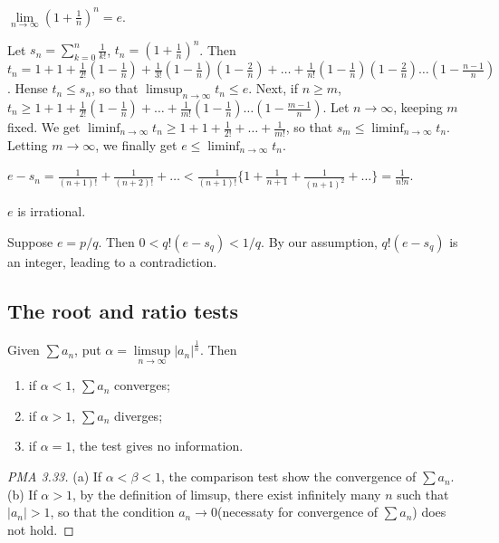 \begin{theorem}
[pma 3.31]
$\lim\limits_{n\to \infty}(1+\frac{1}{n})^n=e$.
\end{theorem}
\begin{hardproof}
Let $s_n=\sum_{k=0}^n\frac{1}{k!}$, $t_n=(1+\frac{1}{n})^n$. Then $t_n=1+1+\frac{1}{2!}(1-\frac{1}{n})+\frac{1}{3!}(1-\frac{1}{n})(1-\frac{2}{n})+\dots+\frac{1}{n!}(1-\frac{1}{n})(1-\frac{2}{n})\dots(1-\frac{n-1}{n})$. Hense $t_n\leq s_n$, so that $\limsup_{n\to \infty}t_n\leq e$. Next, if $n\geq m$, $t_n\geq 1+1+\frac{1}{2!}(1-\frac{1}{n})+\dots+\frac{1}{m!}(1-\frac{1}{n})\dots(1-\frac{m-1}{n})$. Let $n\to \infty$, keeping $m$ fixed. We get $\liminf_{n\to \infty}t_n\geq 1+1+\frac{1}{2!}+\dots+\frac{1}{m!}$, so that $s_m\leq \liminf_{n\to \infty} t_n$. Letting $m\to \infty$, we finally get $e\leq \liminf_{n\to \infty}t_n$.
\end{hardproof}

\begin{remark}
[pma 3.32]
$e-s_n=\frac{1}{(n+1)!}+\frac{1}{(n+2)!}+\dots<\frac{1}{(n+1)!}\{1+\frac{1}{n+1}+\frac{1}{(n+1)^2}+\dots\}=\frac{1}{n!n}$.
\end{remark}

\begin{theorem}
[pma 3.32]
$e$ is irrational.
\end{theorem}
\begin{hardproof}
Suppose $e=p/q$. Then $0<q!(e-s_q)<1/q$. By our assumption, $q!(e-s_q)$ is an integer, leading to a contradiction.
\end{hardproof}

\subsection{The root and ratio tests}

\begin{mytheorem}
\label{thm:root_test}
Given $\sum a_n$, put $\alpha = \limsup\limits_{n\to \infty}|a_n|^{\frac{1}{n}}$. Then
\begin{enumerate}[label={(\alph*)}]
\item if $\alpha < 1$, $\sum a_n$ converges;
\item if $\alpha > 1$, $\sum a_n$ diverges;
\item if $\alpha = 1$, the test gives no information.
\end{enumerate}
\end{mytheorem}
\begin{proof}
[PMA 3.33] (a) If $\alpha < \beta < 1$, the comparison test show the convergence of $\sum a_n$. \\
(b) If $\alpha > 1$, by the definition of limsup, there exist infinitely many $n$ such that $|a_n|>1$, so that the condition $a_n\to 0$(necessaty for convergence of $\sum a_n$) does not hold.
\end{proof}

